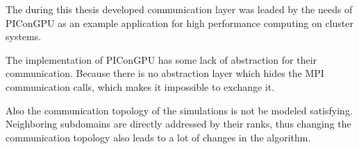 The during this thesis developed communication layer was leaded by the
needs of PIConGPU as an example application for high performance
computing on cluster systems.

The implementation of PIConGPU has some lack of abstraction for their
communication. Because there is no abstraction layer which hides the
MPI communication calls, which makes it impossible to exchange it.

Also the communication topology of the simulations is not be modeled
satisfying. Neighboring subdomains are directly addressed by their
ranks, thus changing the communication topology also leads to a lot of
changes in the algorithm.



\cleardoublepage

